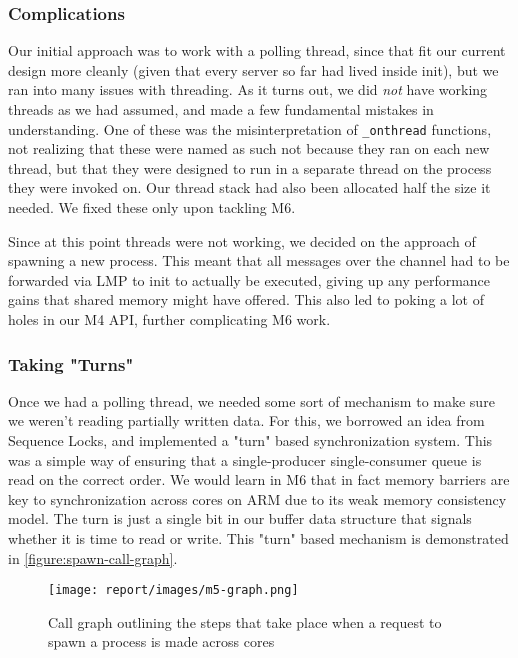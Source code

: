 \subsubsection*{Complications} \label{sec:m5_complication}

Our initial approach was to work with a polling thread, since that fit our current design more cleanly (given that every server so far had lived inside init), but we ran into many issues with threading. As it turns out, we did \emph{not} have working threads as we had assumed, and made a few fundamental mistakes in understanding. One of these was the misinterpretation of \verb|_onthread| functions, not realizing that these were named as such not because they ran on each new thread, but that they were designed to run in a separate thread on the process they were invoked on. Our thread stack had also been allocated half the size it needed. We fixed these only upon tackling M6.

Since at this point threads were not working, we decided on the approach of spawning a new process. This meant that all messages over the channel had to be forwarded via LMP to init to actually be executed, giving up any performance gains that shared memory might have offered. This also led to poking a lot of holes in our M4 API, further complicating M6 work.

\subsubsection*{Taking "Turns"} \label{sec:m5_turns}

Once we had a polling thread, we needed some sort of mechanism to make sure we weren't reading partially written data. For this, we borrowed an idea from Sequence Locks, and implemented a "turn" based synchronization system. This was a simple way of ensuring that a single-producer single-consumer queue is read on the correct order. We would learn in M6 that in fact memory barriers are key to synchronization across cores on ARM due to its weak memory consistency model. The turn is just a single bit in our buffer data structure that signals whether it is time to read or write. This "turn" based mechanism is demonstrated in \autoref{figure:spawn-call-graph}.

\begin{figure}[h!] 
	\texttt{[image: report/images/m5-graph.png]}
	\caption{Call graph outlining the steps that take place when a request to spawn a process is made across cores}
	\label{figure:spawn-call-graph}
	\centering
\end{figure}

